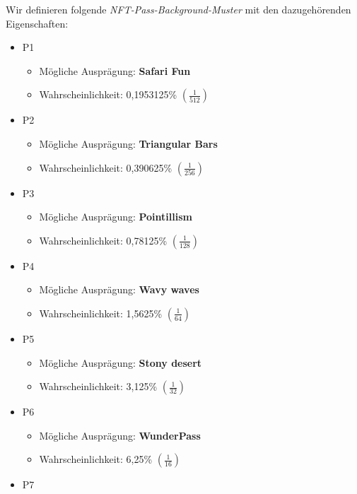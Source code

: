 \begin{NFT-Prop}
\label{pattern}

Wir definieren folgende \textit{NFT-Pass-Background-Muster} mit den dazugehörenden Eigenschaften:

\begin{itemize}
    \item P1
    \begin{itemize}
    	\item Mögliche Ausprägung: \textbf{Safari Fun} 
    	\item Wahrscheinlichkeit: 0,1953125\% $\left( \frac{1}{512} \right)$
    \end{itemize}
    \item P2
    \begin{itemize}
    	\item Mögliche Ausprägung: \textbf{Triangular Bars} 
    	\item Wahrscheinlichkeit: 0,390625\% $\left( \frac{1}{256} \right)$
    \end{itemize}
    \item P3
    \begin{itemize}
    	\item Mögliche Ausprägung: \textbf{Pointillism} 
    	\item Wahrscheinlichkeit: 0,78125\% $\left( \frac{1}{128} \right)$
    \end{itemize}
    \item P4
    \begin{itemize}
    	\item Mögliche Ausprägung: \textbf{Wavy waves} 
    	\item Wahrscheinlichkeit: 1,5625\% $\left( \frac{1}{64} \right)$
    \end{itemize}
    \item P5
    \begin{itemize}
    	\item Mögliche Ausprägung: \textbf{Stony desert} 
    	\item Wahrscheinlichkeit: 3,125\% $\left( \frac{1}{32} \right)$
    \end{itemize}
    \item P6
    \begin{itemize}
    	\item Mögliche Ausprägung: \textbf{WunderPass} 
    	\item Wahrscheinlichkeit: 6,25\% $\left( \frac{1}{16} \right)$
    \end{itemize}
    \item P7

\end{itemize}
\end{NFT-Prop}
